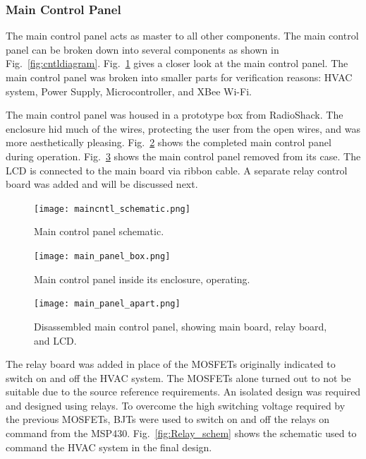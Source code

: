 \subsubsection{Main Control Panel}
The main control panel acts as master to all other components. The main control panel can be broken down into several components as shown in Fig.~\ref{fig:cntldiagram}. Fig.~\ref{fig:main_cntl_schematic} gives a closer look at the main control panel.  The main control panel was broken into smaller parts for verification reasons: HVAC system, Power Supply, Microcontroller, and XBee Wi-Fi.

The main control panel was housed in a prototype box from RadioShack.  The enclosure hid much of the wires, protecting the user from the open wires, and was more aesthetically pleasing. Fig.~\ref{fig:main_panel_box} shows the completed main control panel during operation.  Fig.~\ref{fig:main_panel_apart} shows the main control panel removed from its case.  The LCD is connected to the main board via ribbon cable.  A separate relay control board was added and will be discussed next.

\begin{figure}[htbp]
\centering
\texttt{[image: maincntl\_schematic.png]}
\caption{Main control panel schematic.}
\label{fig:main_cntl_schematic}
\end{figure}

\begin{figure}[htbp]
\centering
\texttt{[image: main\_panel\_box.png]}
\caption{Main control panel inside its enclosure, operating.}
\label{fig:main_panel_box}
\end{figure}

\begin{figure}[htbp]
\centering
\texttt{[image: main\_panel\_apart.png]}
\caption{Disassembled main control panel, showing main board, relay board, and LCD.}
\label{fig:main_panel_apart}
\end{figure}

The relay board was added in place of the MOSFETs originally indicated to switch on and off the HVAC system.  The MOSFETs alone turned out to not be suitable due to the source reference requirements.  An isolated design was required and designed using relays.  To overcome the high switching voltage required by the previous MOSFETs, BJTs were used to switch on and off the relays on command from the MSP430.  Fig.~\ref{fig:Relay_schem} shows the schematic used to command the HVAC system in the final design.

